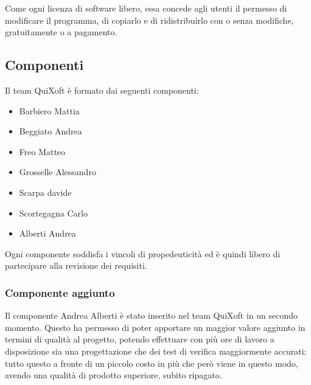 \documentclass[11pt,a4paper]{article}
\begin{document}
Come ogni licenza di software libero, essa concede agli utenti il permes\-so di modificare il programma, di copiarlo e di ridistribuirlo con o senza modifiche, gratuitamente o a pagamento.
\subsection{Componenti}
Il team QuiXoft è formato dai seguenti componenti:
\begin{itemize}
\item Barbiero Mattia
\item Beggiato Andrea
\item Freo Matteo
\item Grosselle Alessandro
\item Scarpa davide
\item Scortegagna Carlo
\item Alberti Andrea
\end{itemize}
Ogni componente soddisfa i vincoli di propedeuticità ed è quindi libero di partecipare alla revisione dei requisiti.
\subsubsection{Componente aggiunto}
Il componente Andrea Alberti è stato inserito nel team QuiXoft in un secondo momento. Questo ha permesso di poter apportare un maggior valore aggiunto in termini di qualità al progetto, potendo effettuare con più ore di lavoro a disposizione sia una progettazione che dei test di verifica maggiormente accurati; tutto questo a fronte di un piccolo costo in più che però viene in questo modo, avendo una qualità di prodotto superiore, subito ripagato.
\end{document}
